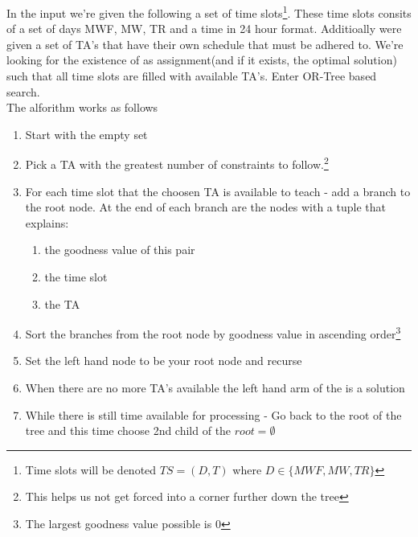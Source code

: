 \documentclass{article}
\begin{document}
In the input we're given the following a set of time
slots\footnote{Time slots will be denoted $TS = (D, T)$ where $D \in
  \{MWF, MW, TR\}$}. These time slots consits of a set of days MWF,
MW, TR and a time in 24 hour format. Additioally were given a set of
TA's that have their own schedule that must be adhered to. We're
looking for the existence of as assignment(and if it exists, the
optimal solution) such that all time slots are filled with available
TA's. Enter OR-Tree based search.\\

The alforithm works as follows

\begin{enumerate}

\item Start with the empty set

\item Pick a TA with the greatest number of constraints to
  follow.\footnote{This helps us not get forced into a corner further
    down the tree}

\item For each time slot that the choosen TA is available to teach -
  add a branch to the root node. At the end of each branch are the
  nodes with a tuple that explains:
  
  \begin{enumerate}

  \item the goodness value of this pair
    
  \item the time slot

  \item the TA

  \end{enumerate}

\item Sort the branches from the root node by goodness value in
  ascending order\footnote{The largest goodness value possible is 0}


\item Set the left hand node to be your root node and recurse

\item When there are no more TA's available the left hand arm of the
  is a solution

\item While there is still time available for processing - Go back to
  the root of the tree and this time choose 2nd child of the $root = \emptyset$

\end{enumerate}
\end{document}

